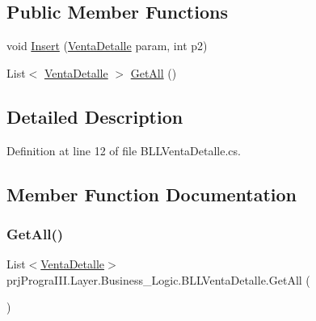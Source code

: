 \subsection*{Public Member Functions}
\begin{DoxyCompactItemize}
\item 
void \hyperlink{classprj_progra_i_i_i_1_1_layer_1_1_business___logic_1_1_b_l_l_venta_detalle_a5d13037ef7919552e90d8f6a50862db4}{Insert} (\hyperlink{classprj_progra_i_i_i_1_1_layer_1_1_entities_1_1_venta_detalle}{Venta\+Detalle} param, int p2)
\item 
List$<$ \hyperlink{classprj_progra_i_i_i_1_1_layer_1_1_entities_1_1_venta_detalle}{Venta\+Detalle} $>$ \hyperlink{classprj_progra_i_i_i_1_1_layer_1_1_business___logic_1_1_b_l_l_venta_detalle_a27f26563248d0c13754d69442e6f7a0a}{Get\+All} ()
\end{DoxyCompactItemize}


\subsection{Detailed Description}


Definition at line 12 of file B\+L\+L\+Venta\+Detalle.\+cs.



\subsection{Member Function Documentation}
\hypertarget{classprj_progra_i_i_i_1_1_layer_1_1_business___logic_1_1_b_l_l_venta_detalle_a27f26563248d0c13754d69442e6f7a0a}{}\label{classprj_progra_i_i_i_1_1_layer_1_1_business___logic_1_1_b_l_l_venta_detalle_a27f26563248d0c13754d69442e6f7a0a} 
\subsubsection{\texorpdfstring{Get\+All()}{GetAll()}}
{\footnotesize\ttfamily List$<$\hyperlink{classprj_progra_i_i_i_1_1_layer_1_1_entities_1_1_venta_detalle}{Venta\+Detalle}$>$ prj\+Progra\+I\+I\+I.\+Layer.\+Business\+\_\+\+Logic.\+B\+L\+L\+Venta\+Detalle.\+Get\+All (\begin{DoxyParamCaption}{ }\end{DoxyParamCaption})}



